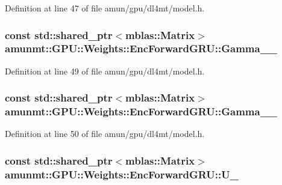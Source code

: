 Definition at line 47 of file amun/gpu/dl4mt/model.\+h.

\subsubsection[{\texorpdfstring{Gamma\+\_\+1\+\_\+}{Gamma_1_}}]{\setlength{\rightskip}{0pt plus 5cm}const std\+::shared\+\_\+ptr$<${\bf mblas\+::\+Matrix}$>$ amunmt\+::\+G\+P\+U\+::\+Weights\+::\+Enc\+Forward\+G\+R\+U\+::\+Gamma\+\_\+\_\+}\hypertarget{structamunmt_1_1GPU_1_1Weights_1_1EncForwardGRU_a6153cf4769ec243b60a4f5ba0aabcf14}{}\label{structamunmt_1_1GPU_1_1Weights_1_1EncForwardGRU_a6153cf4769ec243b60a4f5ba0aabcf14}


Definition at line 49 of file amun/gpu/dl4mt/model.\+h.

\subsubsection[{\texorpdfstring{Gamma\+\_\+2\+\_\+}{Gamma_2_}}]{\setlength{\rightskip}{0pt plus 5cm}const std\+::shared\+\_\+ptr$<${\bf mblas\+::\+Matrix}$>$ amunmt\+::\+G\+P\+U\+::\+Weights\+::\+Enc\+Forward\+G\+R\+U\+::\+Gamma\+\_\+\_\+}\hypertarget{structamunmt_1_1GPU_1_1Weights_1_1EncForwardGRU_a7e9c15eb25ea72a9272b88581e57de3f}{}\label{structamunmt_1_1GPU_1_1Weights_1_1EncForwardGRU_a7e9c15eb25ea72a9272b88581e57de3f}


Definition at line 50 of file amun/gpu/dl4mt/model.\+h.

\subsubsection[{\texorpdfstring{U\+\_\+}{U_}}]{\setlength{\rightskip}{0pt plus 5cm}const std\+::shared\+\_\+ptr$<${\bf mblas\+::\+Matrix}$>$ amunmt\+::\+G\+P\+U\+::\+Weights\+::\+Enc\+Forward\+G\+R\+U\+::\+U\+\_\+}\hypertarget{structamunmt_1_1GPU_1_1Weights_1_1EncForwardGRU_a029b5eae41b5d49976a0db6de61f9a28}{}\label{structamunmt_1_1GPU_1_1Weights_1_1EncForwardGRU_a029b5eae41b5d49976a0db6de61f9a28}


